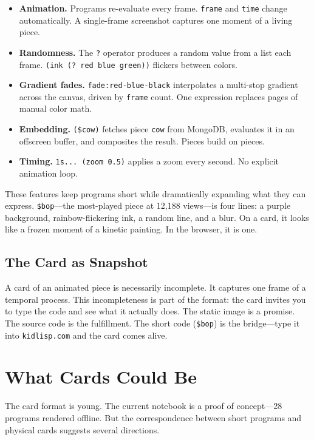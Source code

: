\documentclass[10pt,letterpaper,twocolumn]{article}
\begin{document}
\begin{itemize}
  \item \textbf{Animation.} Programs re-evaluate every frame. \texttt{frame} and \texttt{time} change automatically. A single-frame screenshot captures one moment of a living piece.
  \item \textbf{Randomness.} The \texttt{?} operator produces a random value from a list each frame. \texttt{(ink (? red blue green))} flickers between colors.
  \item \textbf{Gradient fades.} \texttt{fade:red-blue-black} interpolates a multi-stop gradient across the canvas, driven by \texttt{frame} count. One expression replaces pages of manual color math.
  \item \textbf{Embedding.} \texttt{(\$cow)} fetches piece \texttt{cow} from MongoDB, evaluates it in an offscreen buffer, and composites the result. Pieces build on pieces.
  \item \textbf{Timing.} \texttt{1s... (zoom 0.5)} applies a zoom every second. No explicit animation loop.
\end{itemize}

These features keep programs short while dramatically expanding what they can express. \texttt{\$bop}---the most-played piece at 12,188 views---is four lines: a purple background, rainbow-flickering ink, a random line, and a blur. On a card, it looks like a frozen moment of a kinetic painting. In the browser, it is one.

\subsection{The Card as Snapshot}

A card of an animated piece is necessarily incomplete. It captures one frame of a temporal process. This incompleteness is part of the format: the card invites you to type the code and see what it actually does. The static image is a promise. The source code is the fulfillment. The short code (\texttt{\$bop}) is the bridge---type it into \texttt{kidlisp.com} and the card comes alive.



\section{What Cards Could Be}
\label{sec:futures}

The card format is young. The current notebook is a proof of concept---28 programs rendered offline. But the correspondence between short programs and physical cards suggests several directions.
\end{document}

